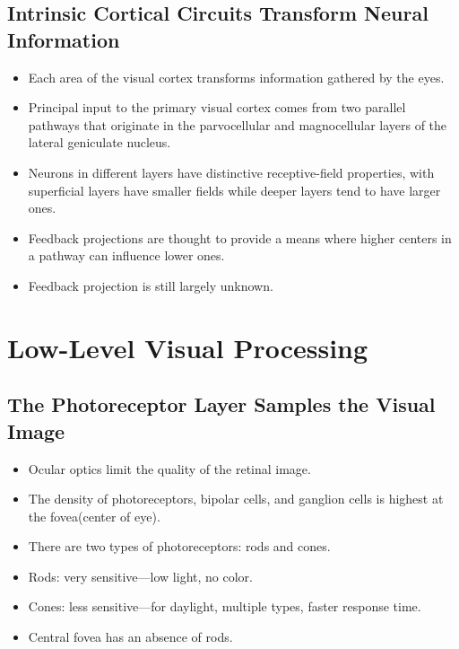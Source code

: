 \documentclass[12pt,a4paper]{article}
\begin{document}
\subsection{Intrinsic Cortical Circuits Transform Neural Information}
\begin{itemize}
    \item Each area of the visual cortex transforms information gathered by the eyes.
    \item Principal input to the primary visual cortex comes from two parallel pathways that originate in the parvocellular and magnocellular layers of the lateral geniculate nucleus.
    \item Neurons in different layers have distinctive receptive-field properties, with superficial layers have smaller fields while deeper layers tend to have larger ones.
    \item Feedback projections are thought to provide a means where higher centers in a pathway can influence lower ones.
    \item Feedback projection is still largely unknown.
\end{itemize}


\clearpage
\section{Low-Level Visual Processing}
\subsection{The Photoreceptor Layer Samples the Visual Image}
\begin{itemize}
    \item Ocular optics limit the quality of the retinal image.
    \item The density of photoreceptors, bipolar cells, and ganglion cells is highest at the fovea(center of eye).
    \item There are two types of photoreceptors: rods and cones.
    \item Rods: very sensitive---low light, no color.
    \item Cones: less sensitive---for daylight, multiple types, faster response time.
    \item Central fovea has an absence of rods.
\end{itemize}
\end{document}
